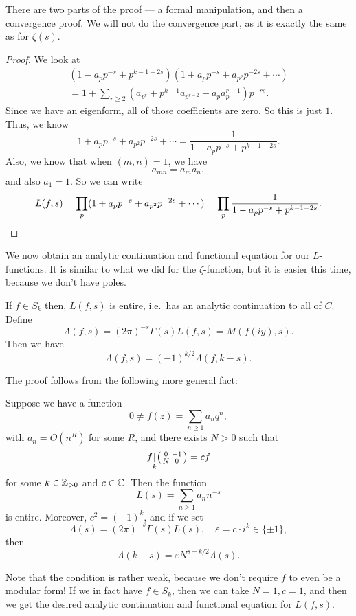 \documentclass[a4paper]{article}
\begin{document}
There are two parts of the proof --- a formal manipulation, and then a convergence proof. We will not do the convergence part, as it is exactly the same as for $\zeta(s)$.
\begin{proof}
  We look at
  \begin{multline*}
    (1 - a_p p^{-s} + p^{k - 1 - 2s}) (1 + a_p p^{-s} + a_{p^2} p^{-2s} + \cdots) \\
    = 1 + \sum_{r \geq 2} (a_{p^r} + p^{k - 1} a_{p^{r - 2}} - a_p a_p^{r - 1}) p^{-rs}.
  \end{multline*}
  Since we have an eigenform, all of those coefficients are zero. So this is just $1$. Thus, we know
  \[
    1 + a_p p^{-s} + a_{p^2} p^{-2s} + \cdots = \frac{1}{1 - a_p p^{-s} + p^{k - 1 - 2s}}.
  \]
  Also, we know that when $(m, n) = 1$, we have
  \[
    a_{mn} = a_m a_n,
  \]
  and also $a_1 = 1$. So we can write
  \[
    L(f, s) = \prod_p (1 + a_p p^{-s} + a_{p^2} p^{-2s} + \cdots) = \prod_p \frac{1}{1 - a_p p^{-s} + p^{k - 1 - 2s}}.\qedhere
  \]
\end{proof}

We now obtain an analytic continuation and functional equation for our $L$-functions. It is similar to what we did for the $\zeta$-function, but it is easier this time, because we don't have poles.
\begin{thm}
  If $f \in S_k$ then, $L(f, s)$ is entire, i.e.\ has an analytic continuation to all of $C$. Define
  \[
    \Lambda(f, s) = (2\pi)^{-s} \Gamma(s) L(f, s) = M(f(iy), s).
  \]
  Then we have
  \[
    \Lambda(f, s) = (-1)^{k/2} \Lambda(f, k - s).
  \]
\end{thm}

The proof follows from the following more general fact:
\begin{thm}
  Suppose we have a function
  \[
    0 \not= f(z) = \sum_{n \geq 1} a_n q^n,
  \]
  with $a_n = O(n^R)$ for some $R$, and there exists $N > 0$ such that
  \[
    f\underset{k}{|}
    \begin{psmallmatrix}
      0 & -1\\
      N & 0
    \end{psmallmatrix} = cf
  \]
  for some $k \in \mathbb{Z}_{> 0}$ and $c \in \mathbb{C}$. Then the function
  \[
    L(s) = \sum_{n \geq 1} a_n n^{-s}
  \]
  is entire. Moreover, $c^2 = (-1)^k$, and if we set
  \[
    \Lambda(s) = (2\pi)^{-s} \Gamma(s) L(s), \quad \varepsilon = c \cdot i^k \in \{\pm 1\},
  \]
  then
  \[
    \Lambda(k - s) = \varepsilon N^{s - k/2} \Lambda(s).
  \]
\end{thm}
Note that the condition is rather weak, because we don't require $f$ to even be a modular form! If we in fact have $f \in S_k$, then we can take $N = 1, c = 1$, and then we get the desired analytic continuation and functional equation for $L(f, s)$.
\end{document}
